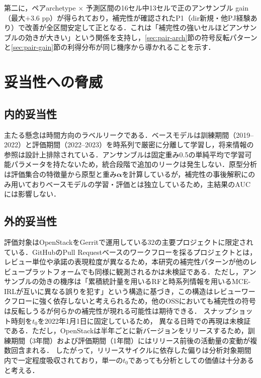 \documentclass[submit,noauthor,ses,dvipdfmx]{ipsj}
\begin{document}
第二に，ペアarchetype $\times$ 予測区間の16セル中13セルで正のアンサンブル gain（最大$+3.6$ pp）が得られており，補完性が確認されたP1（dir新規・他PJ経験あり）で改善が全区間安定して正となる．これは「補完性の強いセルほどアンサンブルの効きが大きい」という関係を支持し，\ref{sec:pair-arch}節の符号反転パターンと\ref{sec:pair-gain}節の利得分布が同じ機序から導かれることを示す．

\section{妥当性への脅威}\label{sec:validity}
\subsection{内的妥当性}
主たる懸念は時間方向のラベルリークである．ベースモデルは訓練期間（2019--2022）と評価期間（2022--2023）を時系列で厳密に分離して学習し，将来情報の参照は設計上排除されている．アンサンブルは固定重み0.5の単純平均で学習可能パラメータを持たないため，統合段階で追加のリークは発生しない．原型分析は評価集合の特徴量から原型と重み$\bm{\alpha}$を計算しているが，補完性の事後解釈にのみ用いておりベースモデルの学習・評価とは独立しているため，主結果のAUCには影響しない．

\subsection{外的妥当性}
評価対象はOpenStackをGerritで運用している32の主要プロジェクトに限定されている．GitHubのPull Requestベースのワークフローを採るプロジェクトとは，レビュー単位や承諾の表現粒度が異なるため，本研究の補完性パターンが他のレビュープラットフォームでも同様に観測されるかは未検証である．ただし，アンサンブルの効きの機序は「累積統計量を用いるRFと時系列情報を用いるMCE-IRLが互いに異なる誤りを犯す」という構造に基づき，この構造はレビューワークフローに強く依存しないと考えられるため，他のOSSにおいても補完性の符号は反転しうるが何らかの補完性が現れる可能性は期待できる．
スナップショット時刻を$t_0$を2022年1月1日に固定しているため，
異なる日時での再現は未検証である．ただし，OpenStackは半年ごとに新バージョンをリリースするため，訓練期間（3年間）および評価期間（1年間）にはリリース前後の活動量の変動が複数回含まれる．
したがって，リリースサイクルに依存した偏りは分析対象期間内で一定程度吸収されており，単一の$t_0$であっても分析としての価値は十分あると考える．
\end{document}
